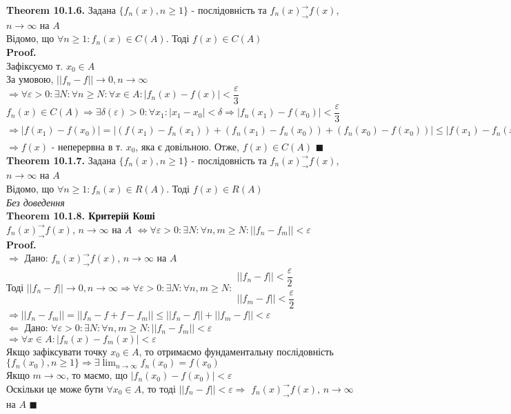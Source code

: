 \documentclass[a4paper, 14pt]{extarticle}
\def\huge{\displaystyle}
\def\bigline{\vspace{5mm}\\}
\def\th#1{\textbf{Theorem {#1}}}
\def\proof{\textbf{Proof.}\\}
\def\bigline{\vspace{5mm}\\}
\def\qed{$\blacksquare$}
\begin{document}
\th{10.1.6.} Задана $\{f_n(x), n \geq 1\}$ - послідовність та $f_n(x)^\rightarrow_\rightarrow f(x)$, $n \to \infty$ на $A$\\
Відомо, що $\forall n \geq 1: f_n(x) \in C(A)$. Тоді $f(x) \in C(A)$\\
\proof
Зафіксуємо т. $x_0 \in A$\\
За умовою, $||f_n-f|| \to 0, n \to \infty$\\
$\Rightarrow \forall \varepsilon > 0: \exists N: \forall n \geq N: \forall x \in A: |f_n(x)-f(x)| < \dfrac{\varepsilon}{3}$\\
$f_n(x) \in C(A) \Rightarrow \exists \delta(\varepsilon) > 0: \forall x_1: |x_1 - x_0| < \delta \Rightarrow |f_n(x_1) - f(x_0)| < \dfrac{\varepsilon}{3}$\\
$\Rightarrow |f(x_1) - f(x_0)| = |(f(x_1)-f_n(x_1)) + (f_n(x_1)-f_n(x_0)) + (f_n(x_0)-f(x_0))| \leq |f(x_1)-f_n(x_1)| + |f_n(x_1) - f_n(x_0)| + |f_n(x_0) - f(x_0)| < \dfrac{\varepsilon}{3} + \dfrac{\varepsilon}{3} + \dfrac{\varepsilon}{3} = \varepsilon$\\
$\Rightarrow f(x)$ - неперервна в т. $x_0$, яка є довільною. Отже, $f(x) \in C(A)$ \qed
\bigline
\th{10.1.7.} Задана $\{f_n(x), n \geq 1\}$ - послідовність та $f_n(x)^\rightarrow_\rightarrow f(x)$, $n \to \infty$ на $A$\\
Відомо, що $\forall n \geq 1: f_n(x) \in R(A)$. Тоді $f(x) \in R(A)$\\
\textit{Без доведення}
\bigline
\th{10.1.8. Критерій Коші}\\
$f_n(x)^\rightarrow_\rightarrow f(x)$, $n \to \infty$ на $A$ $\iff \forall \varepsilon > 0: \exists N: \forall n,m \geq N: ||f_n - f_m|| < \varepsilon$\\
\proof
$\boxed{\Rightarrow}$ Дано: $f_n(x)^\rightarrow_\rightarrow f(x)$, $n \to \infty$ на $A$\\
Тоді $||f_n - f|| \to 0, n \to \infty \Rightarrow \forall \varepsilon > 0: \exists N: \forall n,m \geq N: \begin{gathered} ||f_n-f|| < \dfrac{\varepsilon}{2} \\ ||f_m-f|| < \dfrac{\varepsilon}{2} \end{gathered}$\\
$\Rightarrow ||f_n - f_m|| = ||f_n - f + f - f_m|| \leq ||f_n - f|| + ||f_m - f|| < \varepsilon$
\bigline
$\boxed{\Leftarrow}$ Дано: $\forall \varepsilon > 0: \exists N: \forall n,m \geq N: ||f_n - f_m|| < \varepsilon$\\
$\Rightarrow \forall x \in A: |f_n(x) - f_m(x)| < \varepsilon$\\
Якщо зафіксувати точку $x_0 \in A$, то отримаємо фундаментальну послідовність $\{f_n(x_0), n \geq 1\} \Rightarrow \exists \huge \lim_{n \to \infty} f_n(x_0) = f(x_0)$\\
Якщо $m \to \infty$, то маємо, що $|f_n(x_0) - f(x_0)| < \varepsilon$\\
Оскільки це може бути $\forall x_0 \in A$, то тоді $||f_n - f|| < \varepsilon \Rightarrow$ $f_n(x)^\rightarrow_\rightarrow f(x)$, $n \to \infty$ на $A$ \qed
\bigline
\end{document}
